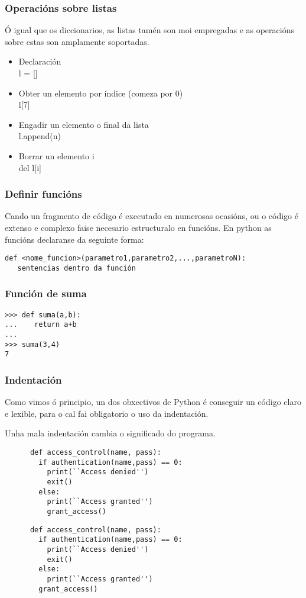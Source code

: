 \begin{frame}
  \frametitle{Operacións sobre listas}
  Ó igual que os diccionarios, as listas tamén son moi empregadas e as
  operacións sobre estas son amplamente soportadas.
  \begin{itemize}
  \item Declaración\\
    l = []
  \item Obter un elemento por índice (comeza por 0)\\
    l[7]
  \item Engadir un elemento o final da lista\\
    l.append(n)
  \item Borrar un elemento i\\
    del l[i]
  \end{itemize}
\end{frame}

\begin{frame}[fragile]
  \frametitle{Definir funcións}
  Cando un fragmento de código é executado en numerosas ocasións, ou o código é
  extenso e complexo faise necesario estructuralo en funcións. En python as
  funcións declaranse da seguinte forma:
  \small
\begin{verbatim}
def <nome_funcion>(parametro1,parametro2,...,parametroN):
   sentencias dentro da función
\end{verbatim}  
  \normalsize
\end{frame}

\begin{frame}[fragile]
  \frametitle{Función de suma}
  \small
\begin{verbatim}
>>> def suma(a,b):
...    return a+b
... 
>>> suma(3,4)
7
\end{verbatim}
\end{frame}

\begin{frame}[fragile]
  \frametitle{Indentación}
  Como vimos ó principio, un dos obxectivos de Python é conseguir un código
  claro e lexible, para o cal fai obligatorio o uso da indentación.

  Unha mala indentación cambia o significado do programa.
  \begin{multicols}{2}
    \begin{lstlisting}
      def access_control(name, pass):
        if authentication(name,pass) == 0:
          print(``Access denied'')
          exit()
        else:
          print(``Access granted'')
          grant_access()
    \end{lstlisting}
    \columnbreak
    \begin{lstlisting}
      def access_control(name, pass):
        if authentication(name,pass) == 0:
          print(``Access denied'')
          exit()
        else:
          print(``Access granted'')
        grant_access()
    \end{lstlisting}
  \end{multicols}
\end{frame}

